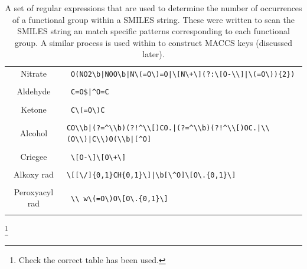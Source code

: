 \begin{table}[H]
\begin{tabular}{c|p{5in}}
Nitrate & \verb! O(NO2\b|NOO\b|N\(=O\)=O|\[N\+\](?:\[O-\\]|\(=O\)){2})!\\&\\

Aldehyde & \verb! C=O$|^O=C!\\&\\

Ketone & \verb! C\(=O\)C!\\&\\

Alcohol & \verb-CO\\b|(?=^\\b)(?!^\\[)CO.|(?=^\\b)(?!^\\[)OC.|\\(O\\)|C\\)O(\\b|[^O]-\\&\\

Criegee & \verb! \[O-\]\[O\+\]!\\&\\

Alkoxy rad & \verb!\[[\/]{0,1}CH{0,1}\]|\b[\^O]\[O\.{0,1}\]!\\&\\

Peroxyacyl rad & \verb! \\ w\(=O\)O\[O\.{0,1}\]!\\&\\

    \end{tabular}

    \caption{ A set of regular expressions that are used to determine the number of occurrences of a functional group within a SMILES string. These were written to scan the SMILES string an match specific patterns corresponding to each functional group. A similar process is used within \citep{rdkitcode} to construct MACCS keys (discussed later).}
    \label{tab:fngroups}
\end{table}\footnote{Check the correct table has been used.}



